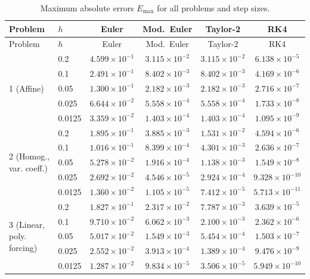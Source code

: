 \documentclass[10pt,letterpaper]{article}
\begin{document}
{\footnotesize
\begin{longtable}{@{}llcccc@{}}
\caption{Maximum absolute errors $E_{\max}$ for all problems and step sizes.}\\
\toprule
Problem & $h$ & Euler & Mod.\ Euler & Taylor-2 & RK4\\\midrule
\endfirsthead
\toprule Problem & $h$ & Euler & Mod.\ Euler & Taylor-2 & RK4\\\midrule
\endhead
\multirow{5}{*}{1 (Affine)} & 0.2 & $4.599\times10^{-1}$ & $3.115\times10^{-2}$ & $3.115\times10^{-2}$ & $6.138\times10^{-5}$ \\
 & 0.1 & $2.491\times10^{-1}$ & $8.402\times10^{-3}$ & $8.402\times10^{-3}$ & $4.169\times10^{-6}$ \\
 & 0.05 & $1.300\times10^{-1}$ & $2.182\times10^{-3}$ & $2.182\times10^{-3}$ & $2.716\times10^{-7}$ \\
 & 0.025 & $6.644\times10^{-2}$ & $5.558\times10^{-4}$ & $5.558\times10^{-4}$ & $1.733\times10^{-8}$ \\
 & 0.0125 & $3.359\times10^{-2}$ & $1.403\times10^{-4}$ & $1.403\times10^{-4}$ & $1.095\times10^{-9}$ \\
\midrule
\multirow{5}{*}{2 (Homog., var. coeff.)} & 0.2 & $1.895\times10^{-1}$ & $3.885\times10^{-3}$ & $1.531\times10^{-2}$ & $4.594\times10^{-6}$ \\
 & 0.1 & $1.016\times10^{-1}$ & $8.399\times10^{-4}$ & $4.301\times10^{-3}$ & $2.636\times10^{-7}$ \\
 & 0.05 & $5.278\times10^{-2}$ & $1.916\times10^{-4}$ & $1.138\times10^{-3}$ & $1.549\times10^{-8}$ \\
 & 0.025 & $2.692\times10^{-2}$ & $4.546\times10^{-5}$ & $2.924\times10^{-4}$ & $9.328\times10^{-10}$ \\
 & 0.0125 & $1.360\times10^{-2}$ & $1.105\times10^{-5}$ & $7.412\times10^{-5}$ & $5.713\times10^{-11}$ \\
\midrule
\multirow{5}{*}{3 (Linear, poly. forcing)} & 0.2 & $1.827\times10^{-1}$ & $2.317\times10^{-2}$ & $7.787\times10^{-3}$ & $3.639\times10^{-5}$ \\
 & 0.1 & $9.710\times10^{-2}$ & $6.062\times10^{-3}$ & $2.100\times10^{-3}$ & $2.362\times10^{-6}$ \\
 & 0.05 & $5.017\times10^{-2}$ & $1.549\times10^{-3}$ & $5.454\times10^{-4}$ & $1.503\times10^{-7}$ \\
 & 0.025 & $2.552\times10^{-2}$ & $3.913\times10^{-4}$ & $1.389\times10^{-4}$ & $9.476\times10^{-9}$ \\
 & 0.0125 & $1.287\times10^{-2}$ & $9.834\times10^{-5}$ & $3.506\times10^{-5}$ & $5.949\times10^{-10}$ \\

\end{longtable}}
\end{document}
